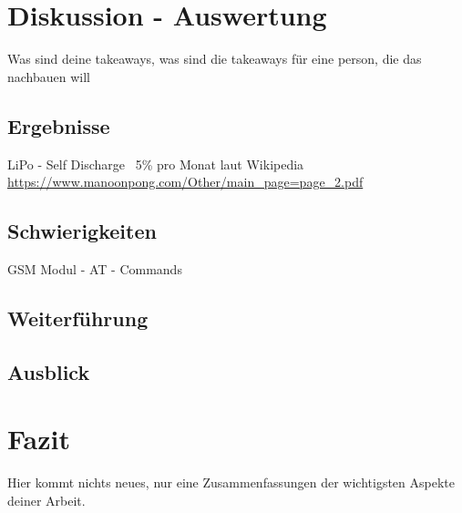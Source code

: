 \section{Diskussion - Auswertung}
Was sind deine takeaways, was sind die takeaways für eine person, die das nachbauen will 

\subsection{Ergebnisse}

LiPo - Self Discharge ~5\% pro Monat laut Wikipedia
\url{https://www.manoonpong.com/Other/main_page=page_2.pdf}


\subsection{Schwierigkeiten}
GSM Modul - AT - Commands



\subsection{Weiterführung}

\subsection{Ausblick}

\section{Fazit}
Hier kommt nichts neues, nur eine Zusammenfassungen der wichtigsten Aspekte deiner Arbeit. 

